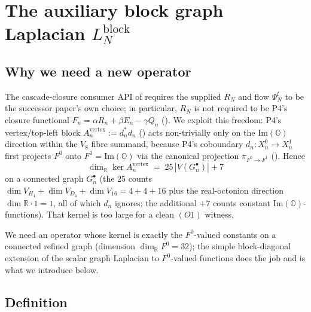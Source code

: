 \documentclass[11pt]{article}
\newcommand{\OO}{\mathbb{O}}
\newcommand{\R}{\mathbb{R}}
\theoremstyle{definition}
\begin{document}
\section{The auxiliary block graph Laplacian $L_N^{\mathrm{block}}$}
\label{sec:block-laplacian}

\subsection{Why we need a new operator}

The cascade-closure consumer API of
\cite[\S 3.4]{CascadeMechanism} requires the supplied $R_N$ and
flow $\Psi_N^{t}$ to be the successor paper's own choice; in
particular, $R_N$ is not required to be P4's closure functional
$F_n = \alpha R_n + \beta E_n - \gamma Q_n$
(\cite[Definition~\texttt{def:Fn}]{ClosureDynamics}). We exploit
this freedom: P4's vertex/top-left block
$A_n^{\mathrm{vertex}} := d_n^{*} d_n$
(\cite[Definition~\texttt{def:An}]{ClosureDynamics}) acts
non-trivially only on the $\mathrm{Im}(\OO)$ direction within the
$V_8$ fibre summand, because P4's coboundary
$d_n \colon X_n^0 \to X_n^1$ first projects $F^0$ onto
$F^1 = \mathrm{Im}(\OO)$ via the canonical projection
$\pi_{F^0 \to F^1}$
(\cite[Definition~\texttt{def:coboundary}]{ClosureDynamics}). Hence
\[
  \dim_{\R} \ker A_n^{\mathrm{vertex}}
  \;=\; 25 \,|V(G_n^\bullet)| + 7
\]
on a connected graph $G_n^\bullet$ (the $25$ counts $\dim
V_{H_4} + \dim V_{D_4} + \dim V_{16} = 4 + 4 + 16$ plus the
real-octonion direction $\dim \R \cdot 1 = 1$, all of which
$d_n$ ignores; the additional $+7$ counts constant
$\mathrm{Im}(\OO)$-functions). That kernel is too large for a
clean $(O1)$ witness.

We need an operator whose kernel is exactly the $F^0$-valued
constants on a connected refined graph (dimension
$\dim_{\R} F^0 = 32$);
the simple block-diagonal extension of the scalar graph
Laplacian to $F^0$-valued functions does the job and is what
we introduce below.

\subsection{Definition}
\end{document}
